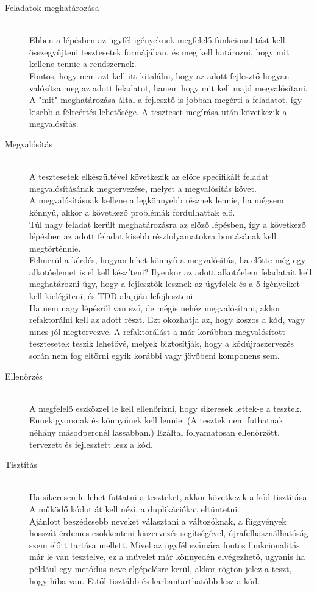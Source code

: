 \begin{description}
\item[Feladatok meghatározása]\hfill\\
     Ebben a lépésben az ügyfél igényeknek megfelelő funkcionalitást kell összegyűjteni tesztesetek formájában, és meg kell határozni, hogy mit kellene tennie a rendszernek.\hfill\\
     Fontos, hogy nem azt kell itt kitalálni, hogy az adott fejlesztő hogyan valósítsa meg az adott feladatot, hanem hogy mit kell majd megvalósítani. A "mit" meghatározása által a fejlesztő is jobban megérti a feladatot, így kisebb a félreértés lehetősége. A teszteset megírása után következik a megvalósítás.
\hfill\\
\item[Megvalósítás]\hfill\\
     A tesztesetek elkészültével következik az előre specifikált feladat megvalósításának megtervezése, melyet a megvalósítás követ.\hfill\\
     A megvalósításnak kellene a legkönnyebb résznek lennie, ha mégsem könnyű, akkor a következő problémák fordulhattak elő. \\
Túl nagy feladat került meghatározásra az előző lépésben, így a következő lépésben az adott feladat kisebb részfolyamatokra bontásának kell megtörténnie.\\
Felmerül a kérdés, hogyan lehet könnyű a megvalósítás, ha előtte még egy alkotóelemet is el kell készíteni? Ilyenkor az adott alkotóelem feladatait kell meghatározni úgy, hogy a fejlesztők lesznek az ügyfelek és a ő igényeiket kell kielégíteni, és TDD alapján lefejleszteni.\\
Ha nem nagy lépésről van szó, de mégis nehéz megvalósítani, akkor refaktorálni kell az adott részt. Ezt okozhatja az, hogy koszos a kód, vagy nincs jól megtervezve. A refaktorálást a már korábban megvalósított tesztesetek teszik lehetővé, melyek biztosítják, hogy a kódújraszervezés során nem fog eltörni egyik korábbi vagy jövőbeni komponens sem.
\hfill\\
\item[Ellenőrzés]\hfill\\
     A megfelelő eszközzel le kell ellenőrizni, hogy sikeresek lettek-e a tesztek. Ennek gyorsnak és könnyűnek kell lennie. (A tesztek nem futhatnak néhány másodpercnél lassabban.) Ezáltal folyamatosan ellenőrzött, tervezett és fejlesztett lesz a kód.
\hfill\\
\item[Tisztítás]\hfill\\
Ha sikeresen le lehet futtatni a teszteket, akkor következik a kód tisztítása. A működő kódot át kell nézi, a duplikációkat eltüntetni.\\Ajánlott beszédesebb neveket választani a változóknak, a függvények hosszát érdemes csökkenteni kiszervezés segítségével, újrafelhasználhatóság szem előtt tartása mellett. Mivel az ügyfél számára fontos funkcionalitás már le van tesztelve, ez a művelet már könnyedén elvégezhető, ugyanis ha például egy metódus neve elgépelésre kerül, akkor rögtön jelez a teszt, hogy hiba van. Ettől tisztább és karbantarthatóbb lesz a kód.
\end{description}

